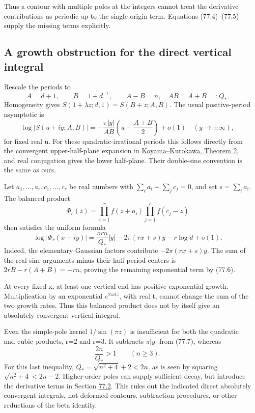 \documentclass[11pt,reqno]{amsart}
\theoremstyle{plain}
\begin{document}
Thus a contour with multiple poles at the integers cannot treat the
derivative contributions as periodic up to the single origin term.
Equations (77.4)--(77.5) supply the missing terms explicitly.

\subsection{A growth obstruction for the direct vertical integral}\label{sec:77.3}

Rescale the periods to
\[
 A=d+1,\qquad B=1+d^{-1},\qquad
 A-B=n,\quad AB=A+B=:Q_*.
\]
Homogeneity gives
\(S(1+\lambda z;d,1)=S(B+z;A,B)\).
The usual positive-period asymptotic is
\begin{equation*}
 \log|S(u+iy;A,B)|
 =-\frac{\pi|y|}{AB}\left(u-\frac{A+B}{2}\right)+o(1)
 \quad(y\longrightarrow\pm\infty),
 \tag{77.6}
\end{equation*}
for fixed real u. For these quadratic-irrational periods this follows
directly from the convergent upper-half-plane expansion in
\href{https://doi.org/10.1112/S0010437X04000521}{Koyama--Kurokawa, Theorem 2},
and real conjugation gives the lower half-plane. Their double-sine
convention is the same as ours.

Let \(a_1,\ldots,a_r,c_1,\ldots,c_r\) be real numbers with
\(\sum_i a_i+\sum_jc_j=0\), and set \(s=\sum_i a_i\).
The balanced product
\[
 \Phi_r(z)=\prod_{i=1}^r f(z+a_i)
           \prod_{j=1}^r f(c_j-z)
\]
then satisfies the uniform formula
\begin{equation*}
 \boxed{\displaystyle
 \log|\Phi_r(x+iy)|=
 \frac{\pi r n}{Q_*}|y|-2\pi(rx+s)y-r\log d+o(1).}
 \tag{77.7}
\end{equation*}
Indeed, the elementary Gaussian factors contribute
\(-2\pi(rx+s)y\). The sum of the real sine arguments minus
their half-period centers is \(2rB-r(A+B)=-rn\), proving
the remaining exponential term by (77.6).

At every fixed x, at least one vertical end has positive exponential
growth. Multiplication by an exponential \(e^{2\pi itz}\), with
real t, cannot change the sum of the two growth rates. Thus this
balanced product does not by itself give an absolutely convergent
vertical integral.

Even the simple-pole kernel \(1/\sin(\pi z)\) is insufficient
for both the quadratic and cubic products, r=2 and r=3. It subtracts
\(\pi|y|\) from (77.7), whereas
\[
 \frac{2n}{Q_*}>1\qquad(n\ge3).
\]
For this last inequality, \(Q_*=\sqrt{n^2+4}+2<2n\), as
is seen by squaring \(\sqrt{n^2+4}<2n-2\).
Higher-order poles can supply sufficient decay, but introduce the
derivative terms in Section \hyperref[sec:77.2]{77.2}. This rules out the indicated direct
absolutely convergent integrals, not deformed contours, subtraction
procedures, or other reductions of the beta identity.
\end{document}
